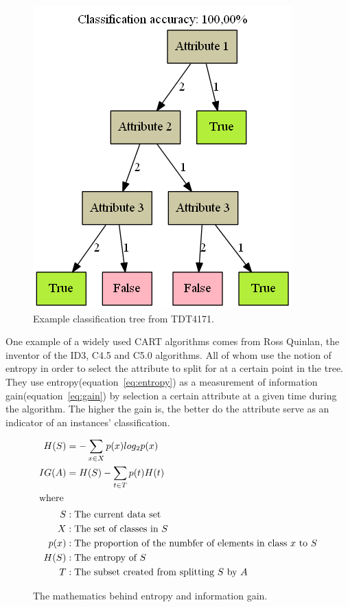 	\begin{figure}[H]%
		\includegraphics[width=\columnwidth]{images/TrivialDecisionTree.png}%
		\caption{Example classification tree from TDT4171. }%
		\label{fig:decisiontree}%
	\end{figure}
	
	\bigskip\noindent
	One example of a widely used CART algorithms comes from Ross Quinlan, the inventor of the ID3, C4.5 and C5.0 algorithms. \cite{quinlan:id3, quinlan:c45}
	All of whom use the notion of entropy in order to select the attribute to split for at a certain point in the tree. 
	They use entropy(equation~\ref{eq:entropy}) as a measurement of information gain(equation~\ref{eq:gain}) by selection a certain attribute at a given time during the algorithm. 
	The higher the gain is, the better do the attribute serve as an indicator of an instances' classification. 
	\begin{figure}[H]
		\begin{align}
			H(S) &= -\sum_{x \in X}p(x)log_2p(x)\label{eq:entropy}\\
			IG(A) &= H(S) - \sum_{t \in T}p(t)H(t)\label{eq:gain}\\
			\intertext{where}
			S &: \text{The current data set}\nonumber\\
			X &: \text{The set of classes in $S$}\nonumber\\
			p(x) &: \text{The proportion of the numbfer of elements in class $x$ to $S$}\nonumber\\
			H(S) &: \text{The entropy of $S$}\nonumber\\
			T &:	 \text{The subset created from splitting $S$ by $A$}\nonumber
		\end{align}
		\caption{The mathematics behind entropy and information gain.}
	\end{figure}
	